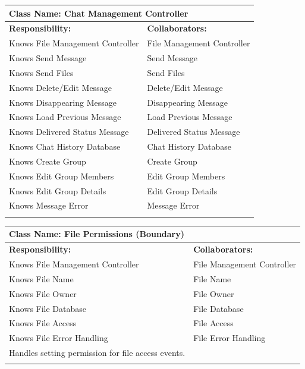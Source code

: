 \documentclass[]{article}
\begin{document}
    	\begin{table}[ht]
		\centering
		\begin{tabular}{|p{7cm}|p{7cm}|}
		\hline 
		\multicolumn{2}{|l|}{\textbf{Class Name:} Chat Management Controller} \\
		\hline
		\textbf{Responsibility:} & \textbf{Collaborators:} \\
		\hline
  			Knows File Management Controller & File Management Controller \\
			Knows Send Message & Send Message \\
			Knows Send Files & Send Files \\
			Knows Delete/Edit Message & Delete/Edit Message \\
			Knows Disappearing Message & Disappearing Message \\
			Knows Load Previous Message & Load Previous Message \\
			Knows Delivered Status Message & Delivered Status Message \\
			Knows Chat History Database & Chat History Database \\
			Knows Create Group & Create Group \\
			Knows Edit Group Members & Edit Group Members \\
			Knows Edit Group Details & Edit Group Details \\
			Knows Message Error & Message Error \\
		\vspace{1in} & \\
		\hline
		\end{tabular}
	\end{table}

    	\begin{table}[ht]
		\centering
		\begin{tabular}{|p{7cm}|p{7cm}|}
		\hline 
		\multicolumn{2}{|l|}{\textbf{Class Name:} File Permissions (Boundary)} \\
		\hline
		\textbf{Responsibility:} & \textbf{Collaborators:} \\
		\hline
  			Knows File Management Controller & File Management Controller \\
			Knows File Name & File Name \\
			Knows File Owner & File Owner \\
			Knows File Database & File Database \\
			Knows File Access & File Access \\
			Knows File Error Handling & File Error Handling \\
			Handles setting permission for file access events. &\\
		\vspace{1in} & \\
		\hline
		\end{tabular}
	\end{table}
\end{document}
